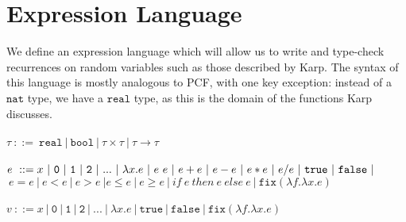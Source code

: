 \documentclass{westhesis}
\theoremstyle{plain}
\theoremstyle{definition}
\begin{document}
\section{Expression Language}
We define an expression language which will allow us to write and type-check recurrences on random variables such as those described by Karp. The syntax of this language is mostly analogous to PCF, with one key exception: instead of a $\texttt{nat}$ type, we have a $\texttt{real}$ type, as this is the domain of the functions Karp discusses. \\ \\
$\tau \ ::= \ \texttt{real} \ | \ \texttt{bool} \ | \ \tau \times \tau \ | \ \tau \rightarrow \tau$ \\ \\
 $e \ ::= x  \ | \ \texttt{0} \ | \ \texttt{1} \ | \ \texttt{2} \ | \ ... \ | \ \lambda x.e \ | \ e \ e \ | \ e + e \ | \ e - e \ | \  e  *  e \ | \ e / e \ | \ \texttt{true} \ | \ \texttt{false} \ | \\$\-\hspace{.8cm}$\ e  =  e \ | \ e < e \ | \ e > e \ | e \leq e \ | \ e \geq e \ | 
 \ if \ e \ then \ e \ else \ e \ | \ \texttt{fix} (\lambda f.\lambda x.e)$ \\ \\
 $v \ ::= x  \ | \ \texttt{0} \ | \ \texttt{1} \ | \ \texttt{2} \ | \ ... \ | \ \lambda x.e \ | \ \texttt{true} \ |  \ \texttt{false} \ 
 | \ \texttt{fix} (\lambda f.\lambda x.e)$
\end{document}
